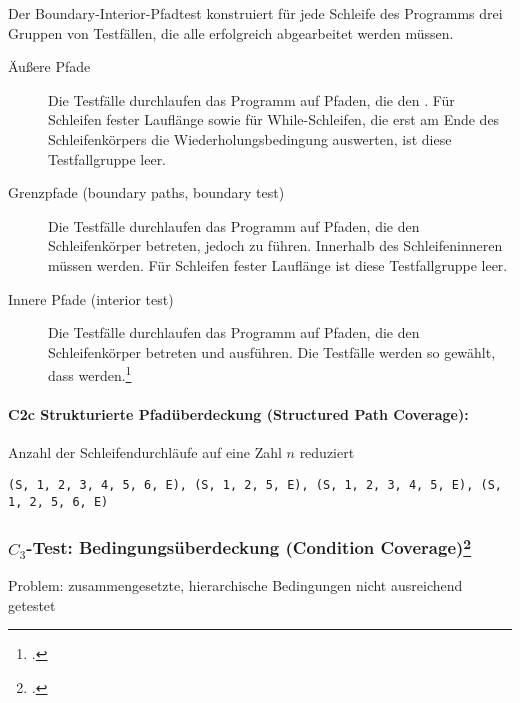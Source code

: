 \documentclass{lehramt-informatik-haupt}
\begin{document}
\noindent
Der Boundary-Interior-Pfadtest konstruiert für jede Schleife des
Programms drei Gruppen von Testfällen, die alle erfolgreich abgearbeitet
werden müssen.

\begin{description}
\item[Äußere Pfade]
Die Testfälle durchlaufen das Programm auf Pfaden, die den
. Für Schleifen fester Lauflänge
sowie für While-Schleifen, die erst am Ende des Schleifenkörpers die
Wiederholungsbedingung auswerten, ist diese Testfallgruppe leer.

\item[Grenzpfade (boundary paths, boundary test)] Die Testfälle
durchlaufen das Programm auf Pfaden, die den Schleifenkörper betreten,
jedoch zu  führen. Innerhalb des
Schleifeninneren müssen  werden.
Für Schleifen fester Lauflänge ist diese Testfallgruppe leer.

\item[Innere Pfade (interior test)] Die Testfälle durchlaufen das
Programm auf Pfaden, die den Schleifenkörper betreten und
 ausführen. Die Testfälle
werden so gewählt, dass  werden.\footcite[Seite 212]{hoffmann}
\end{description}

%

\paragraph{C2c Strukturierte Pfadüberdeckung (Structured Path Coverage):}

\noindent
Anzahl der Schleifendurchläufe auf eine
Zahl $n$ reduziert


\texttt{(S, 1, 2, 3, 4, 5, 6, E), (S, 1, 2, 5, E),
(S, 1, 2, 3, 4, 5, E), (S, 1, 2, 5, 6, E)}

%

\subsubsection{$C_3$-Test: Bedingungsüberdeckung (Condition Coverage)\footcite[Seite 40]{sosy:fs:5}}

Problem: zusammengesetzte, hierarchische Bedingungen nicht ausreichend
getestet
\end{document}
